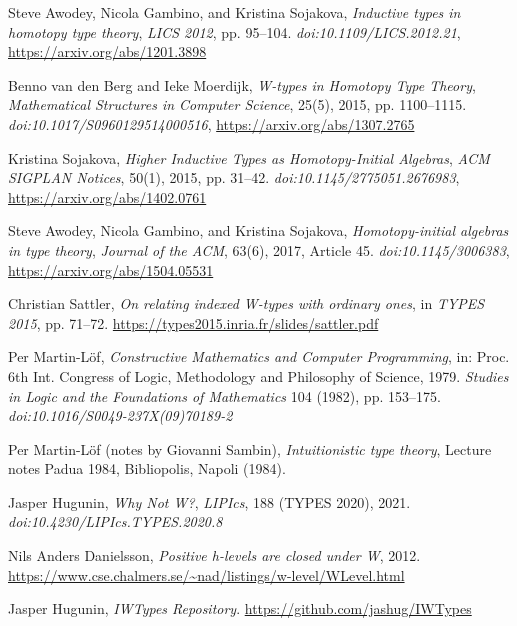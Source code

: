 \documentclass{article}
\theoremstyle{definition}
\begin{document}
\begin{thebibliography}{99}
Steve Awodey, Nicola Gambino, and Kristina Sojakova,
\textit{Inductive types in homotopy type theory},
\textit{LICS 2012}, pp. 95–104.
\textit{doi:10.1109/LICS.2012.21},
\url{https://arxiv.org/abs/1201.3898}

Benno van den Berg and Ieke Moerdijk,
\textit{W-types in Homotopy Type Theory},
\textit{Mathematical Structures in Computer Science}, 25(5), 2015, pp. 1100–1115.
\textit{doi:10.1017/S0960129514000516},
\url{https://arxiv.org/abs/1307.2765}

Kristina Sojakova,
\textit{Higher Inductive Types as Homotopy-Initial Algebras},
\textit{ACM SIGPLAN Notices}, 50(1), 2015, pp. 31–42.
\textit{doi:10.1145/2775051.2676983},
\url{https://arxiv.org/abs/1402.0761}

Steve Awodey, Nicola Gambino, and Kristina Sojakova,
\textit{Homotopy-initial algebras in type theory},
\textit{Journal of the ACM}, 63(6), 2017, Article 45.
\textit{doi:10.1145/3006383},
\url{https://arxiv.org/abs/1504.05531}

Christian Sattler,
\textit{On relating indexed W-types with ordinary ones},
in \textit{TYPES 2015}, pp. 71–72.
\url{https://types2015.inria.fr/slides/sattler.pdf}

Per Martin-Löf,
\textit{Constructive Mathematics and Computer Programming},
in: Proc. 6th Int. Congress of Logic, Methodology and Philosophy of Science, 1979. \textit{Studies in Logic and the Foundations of Mathematics} 104 (1982), pp. 153–175.
\textit{doi:10.1016/S0049-237X(09)70189-2}

Per Martin-Löf (notes by Giovanni Sambin),
\textit{Intuitionistic type theory}, Lecture notes Padua 1984, Bibliopolis, Napoli (1984).

Jasper Hugunin,
\textit{Why Not W?},
\textit{LIPIcs}, 188 (TYPES 2020), 2021.
\textit{doi:10.4230/LIPIcs.TYPES.2020.8}

Nils Anders Danielsson,
\textit{Positive h-levels are closed under W},
2012.
\url{https://www.cse.chalmers.se/~nad/listings/w-level/WLevel.html}

Jasper Hugunin,
\textit{IWTypes Repository}.
\url{https://github.com/jashug/IWTypes}

\end{thebibliography}
\end{document}
